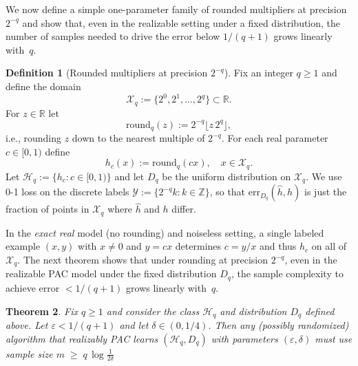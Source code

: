 \documentclass{article}
\newcommand{\cX}{\mathcal{X}}
\newcommand{\cY}{\mathcal{Y}}
\newcommand{\cH}{\mathcal{H}}
\theoremstyle{plain}
\newtheorem{theorem}{Theorem}[section]
\theoremstyle{definition}
\newtheorem{definition}[theorem]{Definition}
\theoremstyle{remark}
\begin{document}
We now define a simple one-parameter family of rounded multipliers at
precision $2^{-q}$ and show that, even in the realizable setting under
a fixed distribution, the number of samples needed to drive the error
below $1/(q+1)$ grows linearly with~$q$.

\begin{definition}[Rounded multipliers at precision $2^{-q}$]
	Fix an integer $q\ge 1$ and define the domain
	\[
	\cX_q := \{2^0,2^1,\dots,2^{q}\} \subset \mathbb{R}.
	\]
	For $z\in\mathbb{R}$ let
	\[
	\mathrm{round}_q(z)
	:= 2^{-q} \bigl\lfloor z\,2^{q} \bigr\rfloor,
	\]
	i.e., rounding $z$ down to the nearest multiple of $2^{-q}$. For each
	real parameter $c\in[0,1)$ define
	\[
	h_c(x) := \mathrm{round}_q(c x),\quad x\in\cX_q.
	\]
	Let $\cH_q := \{h_c : c\in[0,1)\}$ and let $D_q$ be the uniform
	distribution on $\cX_q$. We use 0-1 loss on the discrete labels
	$\cY := \{2^{-q} k : k\in\mathbb{Z}\}$, so that
	$\mathrm{err}_{D_q}(\hat h,h)$ is just the fraction of points in
	$\cX_q$ where $\hat h$ and $h$ differ.
\end{definition}

In the \emph{exact real} model (no rounding) and noiseless setting, a
single labeled example $(x,y)$ with $x\neq 0$ and $y=cx$ determines
$c=y/x$ and thus $h_c$ on all of $\cX_q$. The next theorem shows that
under rounding at precision $2^{-q}$, even in the realizable PAC model
under the fixed distribution $D_q$, the sample complexity to achieve
error $<1/(q+1)$ grows linearly with~$q$.

\begin{theorem}
	\label{thm:pac-rounding-lb}
	Fix $q\ge 1$ and consider the class $\cH_q$ and distribution $D_q$
	defined above. Let $\varepsilon < 1/(q+1)$ and let
	$\delta \in (0,1/4)$. Then any (possibly randomized) algorithm that
	realizably \textnormal{PAC} learns $(\cH_q,D_q)$ with parameters $(\varepsilon,\delta)$
	must use  sample size
	$
	m \;\ge\; q\,\log\frac{1}{2\delta}
	$
\end{theorem}
\end{document}
